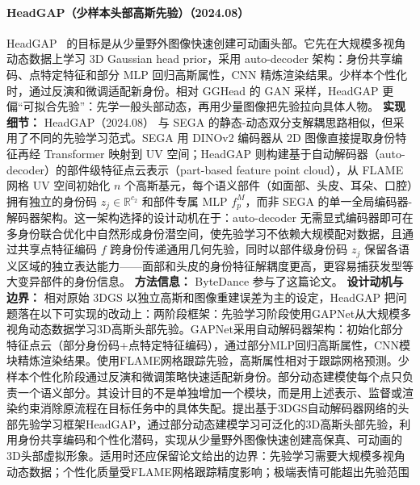 \paragraph{HeadGAP（少样本头部高斯先验）（2024.08）}
HeadGAP~\cite{2408_06019} 的目标是从少量野外图像快速创建可动画头部。它先在大规模多视角动态数据上学习 3D Gaussian head prior，采用 auto-decoder 架构：身份共享编码、点特定特征和部分 MLP 回归高斯属性，CNN 精炼渲染结果。少样本个性化时，通过反演和微调适配新身份。相对 GGHead 的 GAN 采样，HeadGAP 更偏“可拟合先验”：先学一般头部动态，再用少量图像把先验拉向具体人物。
\textbf{实现细节：} HeadGAP（2024.08） 与 SEGA 的静态-动态双分支解耦思路相似，但采用了不同的先验学习范式。SEGA 用 DINOv2 编码器从 2D 图像直接提取身份特征再经 Transformer 映射到 UV 空间；HeadGAP 则构建基于自动解码器（auto-decoder）的部件级特征点云表示（part-based feature point cloud），从 FLAME 网格 UV 空间初始化 $n$ 个高斯基元，每个语义部件（如面部、头皮、耳朵、口腔）拥有独立的身份码 $z_j \in \mathbb{R}^{c_2}$ 和部件专属 MLP $f^M_p$，而非 SEGA 的单一全局编码器-解码器架构。这一架构选择的设计动机在于：auto-decoder 无需显式编码器即可在多身份联合优化中自然形成身份潜空间，使先验学习不依赖大规模配对数据，且通过共享点特征编码 $f$ 跨身份传递通用几何先验，同时以部件级身份码 $z_j$ 保留各语义区域的独立表达能力——面部和头皮的身份特征解耦度更高，更容易捕获发型等大变异部件的身份信息。
\textbf{方法信息：} ByteDance 参与了这篇论文。
\textbf{设计动机与边界：} 相对原始 3DGS 以独立高斯和图像重建误差为主的设定，HeadGAP 把问题落在以下可实现的改动上：两阶段框架：先验学习阶段使用GAPNet从大规模多视角动态数据学习3D高斯头部先验。GAPNet采用自动解码器架构：初始化部分特征点云（部分身份码+点特定特征编码），通过部分MLP回归高斯属性，CNN模块精炼渲染结果。使用FLAME网格跟踪先验，高斯属性相对于跟踪网格预测。少样本个性化阶段通过反演和微调策略快速适配新身份。部分动态建模使每个点只负责一个语义部分。其设计目的不是单独增加一个模块，而是用上述表示、监督或渲染约束消除原流程在目标任务中的具体失配。提出基于3DGS自动解码器网络的头部先验学习框架HeadGAP，通过部分动态建模学习可泛化的3D高斯头部先验，利用身份共享编码和个性化潜码，实现从少量野外图像快速创建高保真、可动画的3D头部虚拟形象。适用时还应保留论文给出的边界：先验学习需要大规模多视角动态数据；个性化质量受FLAME网格跟踪精度影响；极端表情可能超出先验范围
